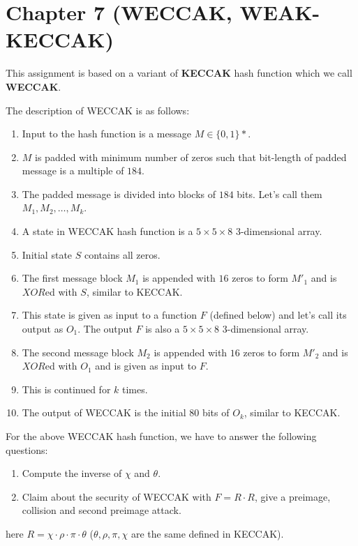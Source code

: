 \documentclass[10pt,twoside]{article}
\newcommand\bold\textbf
\begin{document}
\newpage
\section{Chapter 7 (WECCAK, WEAK-KECCAK)}

This assignment is based on a variant of \bold{KECCAK} hash function which we call \bold{WECCAK}.

The description of WECCAK is as follows:

\begin{enumerate}
  \setlength\itemsep{0em}
  \item Input to the hash function is a message $M \in \{0,1\}*$.
  \item $M$ is padded with minimum number of zeros such that bit-length of padded message is a multiple of $184$.
  \item The padded message is divided into blocks of $184$ bits. Let's call them $M_1,M_2,\dots,M_k$.
  \item A state in WECCAK hash function is a $5\times5\times8$ 3-dimensional array.
  \item Initial state $S$ contains all zeros.
  \item The first message block $M_1$ is appended with $16$ zeros to form $M'_1$ and is $XOR$ed with $S$, similar to KECCAK.
  \item This state is given as input to a function $F$ (defined below) and let's call its output as $O_1$. The output $F$ is also a $5\times5\times8$ 3-dimensional array.
  \item The second message block $M_2$ is appended with $16$ zeros to form $M'_2$ and is $XOR$ed with $O_1$ and is given as input to $F$.
  \item This is continued for $k$ times.
  \item The output of WECCAK is the initial $80$ bits of $O_k$, similar to KECCAK.
\end{enumerate}

For the above WECCAK hash function, we have to answer the following questions:
\begin{enumerate}
  \setlength\itemsep{0em}
  \item Compute the inverse of $\chi$ and $\theta$.
  \item Claim about the security of WECCAK with $F=R\cdot R$, give a preimage, collision and second preimage attack.
\end{enumerate}

here $R=\chi\cdot\rho\cdot\pi\cdot\theta$ ($\theta,\rho,\pi,\chi$ are the same defined in KECCAK).
\end{document}
